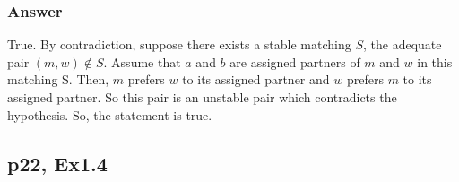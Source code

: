 \documentclass[a4paper]{article}
\begin{document}
\hspace{2cm}

\subsubsection*{Answer}
True. By contradiction, suppose there exists a stable matching $S$, the adequate pair $(m,w) \notin S$. Assume that $a$ and $b$ are assigned partners of $m$ and $w$ in this matching S. Then, $m$ prefers $w$ to its assigned partner and $w$ prefers $m$ to its assigned partner. So this pair is an unstable pair which contradicts the hypothesis. So, the statement is true.
\vspace{2cm}


\subsection*{p22, Ex1.4}
\end{document}

